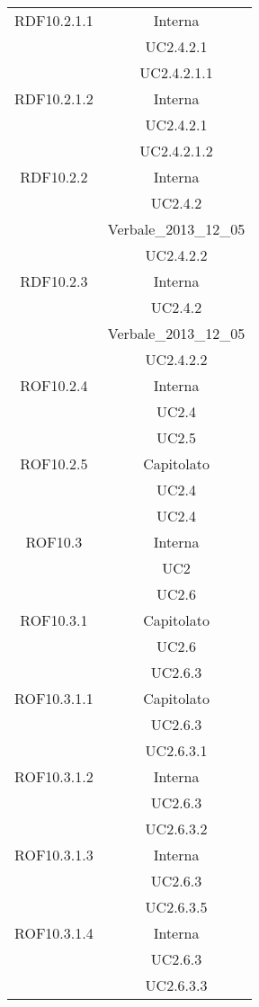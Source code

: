 \begin{longtable}{|c|c|}
\midrule
RDF10.2.1.1
& Interna\\
& UC2.4.2.1\\
& UC2.4.2.1.1
\\

\midrule
RDF10.2.1.2
& Interna\\
& UC2.4.2.1\\
& UC2.4.2.1.2
\\

\midrule
RDF10.2.2
& Interna\\
& UC2.4.2\\
& Verbale\_2013\_12\_05\\
& UC2.4.2.2
\\

\midrule
RDF10.2.3
& Interna\\
& UC2.4.2\\
& Verbale\_2013\_12\_05\\
& UC2.4.2.2
\\

\midrule
ROF10.2.4
& Interna\\
& UC2.4\\
& UC2.5
\\

\midrule
ROF10.2.5
& Capitolato\\
& UC2.4\\
& UC2.4
\\

\midrule
ROF10.3
& Interna\\
& UC2\\
& UC2.6
\\

\midrule
ROF10.3.1
& Capitolato\\
& UC2.6\\
& UC2.6.3
\\

\midrule
ROF10.3.1.1
& Capitolato\\
& UC2.6.3\\
& UC2.6.3.1
\\

\midrule
ROF10.3.1.2
& Interna\\
& UC2.6.3\\
& UC2.6.3.2
\\

\midrule
ROF10.3.1.3
& Interna\\
& UC2.6.3\\
& UC2.6.3.5
\\

\midrule
ROF10.3.1.4
& Interna\\
& UC2.6.3\\
& UC2.6.3.3
\\


\end{longtable}
